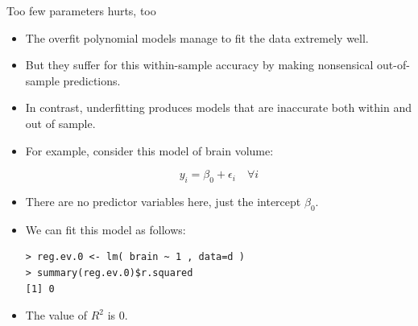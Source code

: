 \documentclass[handout]{beamer}
\begin{document}
\begin{frame}[fragile]{Too few parameters hurts, too}
\scriptsize{

\begin{itemize}
\item The overfit polynomial models manage to fit the data extremely well.

\item But they suffer for this within-sample accuracy by making nonsensical out-of-sample predictions.

\item In contrast, underfitting produces models that are inaccurate both
within and out of sample.

\item For example, consider this model of brain volume:

\begin{displaymath}
 y_i=\beta_{0}+\epsilon_i \quad \forall i
\end{displaymath}

\item There are no predictor variables here, just the intercept $\beta_{0}$.

\item We can fit this model as follows:

\begin{verbatim}
> reg.ev.0 <- lm( brain ~ 1 , data=d )
> summary(reg.ev.0)$r.squared
[1] 0 
\end{verbatim}

\item The value of $R^2$ is 0.

\end{itemize}


} 
\end{frame}
\end{document}
